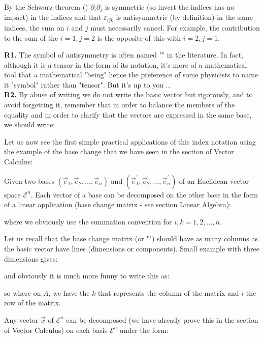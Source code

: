 	By the Schwarz theorem () $\partial_i\partial_j$ is symmetric (so invert the indices has no impact) in the indices and that $\varepsilon_{ijk}$ is antisymmetric (by definition) in the same indices, the sum on $i$ and $j$ must necessarily cancel. For example, the contribution to the sum of the $i=1,j=2$ is the opposite of this with $i=2,j=1$.
	
	\begin{tcolorbox}[title=Remarks,colframe=black,arc=10pt]
	\textbf{R1.} The symbol of antisymmetry is often named "" in the literature. In fact, although it is a tensor in the form of its notation, it's more of a mathematical tool that a mathematical "being" hence the preference of some physicists to name it "symbol" rather than "tensor". But it's up to you ...\\
	
	\textbf{R2.} By abuse of writing we do not write the basic vector but rigorously, and to avoid forgetting it, remember that in order to balance the members of the equality and in order to clarify that the vectors are expressed in the same base, we should write:
	
	\end{tcolorbox}
	Let us now see the first simple practical applications of this index notation using the example of the base change that we have seen in the section of Vector Calculus:
	
	Given two bases $(\vec{e}_1,\vec{e}_2,\ldots,\vec{e}_n)$ and $(\vec{e}_1^{'},\vec{e}_2^{'},\ldots,\vec{e}_n^{'})$ of an Euclidean vector space $\mathcal{E}^n$. Each vector of a base can be decomposed on the other base in the form of a linear application (base change matrix - see section Linear Algebra):
	
	where we obviously use the summation convention for $i,k=1,2,\ldots,n$.
	
	Let us recall that the base change matrix (or "") should have as many columns as the basic vector have lines (dimensions or components). Small example with three dimensions gives:
	
	and obviously it is much more funny to write this as:
	
	so where on $A$, we have the $k$ that represents the column of the matrix and $i$ the row of the matrix.

	Any vector $\vec{x}$ of $\mathcal{E}^n$ can be decomposed (we have already prove this in the section of Vector Calculus) on each basis $\mathcal{E}^n$ under the form:
	
